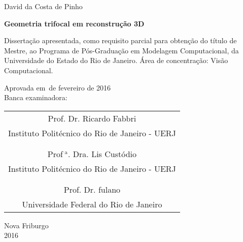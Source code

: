 \thispagestyle{empty}

\begin{center}
David da Costa de Pinho

\vspace{2 cm}

{\bf Geometria trifocal em reconstrução 3D}
\end{center}

\vspace{2 cm}

\begin{flushright}
\begin{minipage}{.5\textwidth}
Dissertação apresentada, como
requisito parcial para obtenção do título de Mestre, ao Programa de Pós-Graduação em Modelagem Computacional, da Universidade do Estado do Rio de Janeiro. Área de concentração: Visão Computacional.
\end{minipage}
\end{flushright}

\begin{flushleft}
Aprovada em\,\,\,de fevereiro de 2016\\
Banca examinadora:
\end{flushleft}

\vspace{1 cm}

\begin{center}
\begin{tabular}{c}
\hline
Prof. Dr. Ricardo Fabbri\\
Instituto Politécnico do Rio de Janeiro - UERJ\\\\\\

\hline
Prof$^{\,\,\text{a}}$. Dra. Lis Custódio\\
Instituto Politécnico do Rio de Janeiro - UERJ\\\\\\

\hline
Prof. Dr. fulano\\
Universidade Federal do Rio de Janeiro
\end{tabular}
\end{center}

\vspace{3 cm}

\begin{center}
Nova Friburgo\\
2016
\end{center}



